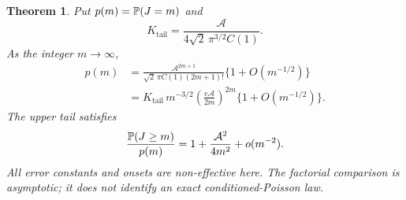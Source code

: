 \documentclass[11pt,letterpaper]{article}
\newtheorem{theorem}{Theorem}[section]
\theoremstyle{remark}\newtheorem{remark}[theorem]{Remark}
\begin{document}
\begin{theorem}\label{men:thm:tail}
Put $p(m)=\mathbb P(J=m)$ and
\begin{equation}\label{men:eq:tailK}
 K_{\mathrm{tail}}=\frac{\mathcal A}{4\sqrt2\,\pi^{3/2}C(1)}.
\end{equation}
As the integer $m\to\infty$,
\begin{align}
 p(m)&=\frac{\mathcal A^{2m+1}}{\sqrt2\,\pi C(1)(2m+1)!}
                      \{1+O(m^{-1/2})\}\label{men:eq:tailfactorial}\\
 &=K_{\mathrm{tail}}\,m^{-3/2}
          \left(\frac{e\mathcal A}{2m}\right)^{2m}
                      \{1+O(m^{-1/2})\}.\label{men:eq:tailmass}
\end{align}
The upper tail satisfies
\begin{equation}\label{men:eq:tailratio}
 \frac{\mathbb P(J\ge m)}{p(m)}
       =1+\frac{\mathcal A^2}{4m^2}+o(m^{-2}).
\end{equation}
All error constants and onsets are non-effective here. The factorial comparison is asymptotic; it does not identify an exact conditioned-Poisson law.
\end{theorem}
\end{document}
